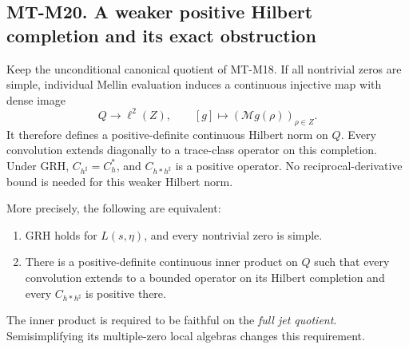\subsection*{MT-M20. A weaker positive Hilbert completion and its exact obstruction}
Keep the unconditional canonical quotient of MT-M18.
If all nontrivial zeros are simple, individual Mellin
evaluation induces a continuous injective map with dense
image
\[
       Q\longrightarrow\ell^2(Z),\qquad
       [g]\longmapsto(\mathcal Mg(\rho))_{\rho\in Z}.   \tag{M20.1}
\]
It therefore defines a positive-definite continuous Hilbert
norm on \(Q\). Every convolution extends diagonally to a
trace-class operator on this completion. Under GRH,
\(C_{h^\sharp}=C_h^*\), and \(C_{h*h^\sharp}\) is a
positive operator. No reciprocal-derivative bound is
needed for this weaker Hilbert norm.

More precisely, the following are equivalent:
\begin{enumerate}
\item GRH holds for \(L(s,\eta)\), and every nontrivial
zero is simple.
\item There is a positive-definite continuous inner
product on \(Q\) such that every convolution extends to
a bounded operator on its Hilbert completion and every
\(C_{h*h^\sharp}\) is positive there.
\end{enumerate}
The inner product is required to be faithful on the
\emph{full jet quotient}. Semisimplifying its multiple-zero
local algebras changes this requirement.

